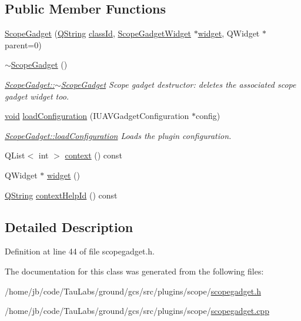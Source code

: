 \subsection*{\-Public \-Member \-Functions}
\begin{DoxyCompactItemize}
\item 
\hyperlink{group___scope_plugin_ga3f75e488a9369b654162e789b9f7d4c8}{\-Scope\-Gadget} (\hyperlink{group___u_a_v_objects_plugin_gab9d252f49c333c94a72f97ce3105a32d}{\-Q\-String} \hyperlink{group___core_plugin_ga3878fde66a57220608960bcc3fbeef2c}{class\-Id}, \hyperlink{class_scope_gadget_widget}{\-Scope\-Gadget\-Widget} $\ast$\hyperlink{group___scope_plugin_ga64f4c7f063a7d85c79728a770d411cb2}{widget}, \-Q\-Widget $\ast$parent=0)
\item 
\hyperlink{group___scope_plugin_ga814c8fd9020778e2cb89a7ab8a49995b}{$\sim$\-Scope\-Gadget} ()
\begin{DoxyCompactList}\small\item\em \hyperlink{group___scope_plugin_ga814c8fd9020778e2cb89a7ab8a49995b}{\-Scope\-Gadget\-::$\sim$\-Scope\-Gadget} \-Scope gadget destructor\-: deletes the associated scope gadget widget too. \end{DoxyCompactList}\item 
\hyperlink{group___u_a_v_objects_plugin_ga444cf2ff3f0ecbe028adce838d373f5c}{void} \hyperlink{group___scope_plugin_ga34947ab35d8b4d37de1a1d70e32e2de5}{load\-Configuration} (\-I\-U\-A\-V\-Gadget\-Configuration $\ast$config)
\begin{DoxyCompactList}\small\item\em \hyperlink{group___scope_plugin_ga34947ab35d8b4d37de1a1d70e32e2de5}{\-Scope\-Gadget\-::load\-Configuration} \-Loads the plugin configuration. \end{DoxyCompactList}\item 
\-Q\-List$<$ int $>$ \hyperlink{group___scope_plugin_gad13cd805d94869e729a8eb14728e2551}{context} () const 
\item 
\-Q\-Widget $\ast$ \hyperlink{group___scope_plugin_ga64f4c7f063a7d85c79728a770d411cb2}{widget} ()
\item 
\hyperlink{group___u_a_v_objects_plugin_gab9d252f49c333c94a72f97ce3105a32d}{\-Q\-String} \hyperlink{group___scope_plugin_gad4bf2378223ce3ef188714a3ce9d9fb3}{context\-Help\-Id} () const 
\end{DoxyCompactItemize}


\subsection{\-Detailed \-Description}


\-Definition at line 44 of file scopegadget.\-h.



\-The documentation for this class was generated from the following files\-:\begin{DoxyCompactItemize}
\item 
/home/jb/code/\-Tau\-Labs/ground/gcs/src/plugins/scope/\hyperlink{scopegadget_8h}{scopegadget.\-h}\item 
/home/jb/code/\-Tau\-Labs/ground/gcs/src/plugins/scope/\hyperlink{scopegadget_8cpp}{scopegadget.\-cpp}\end{DoxyCompactItemize}
